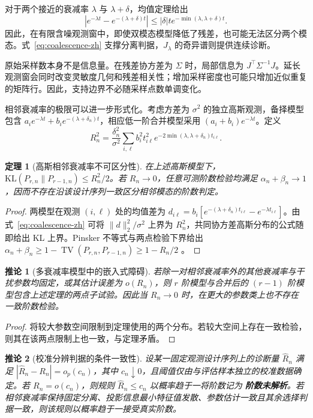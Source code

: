 \documentclass[UTF8,11pt]{ctexart}
\newtheorem{theorem}{定理}
\newtheorem{corollary}{推论}
\newcommand{\indet}{\textup{\bfseries 阶数未解析}}
\begin{document}
对于两个接近的衰减率 $\lambda$ 与 $\lambda+\delta$，均值定理给出
\begin{equation}
|e^{-\lambda t}-e^{-(\lambda+\delta)t}|
\le |\delta|t e^{-\min(\lambda,\lambda+\delta)t}.
\label{eq:coalescence-zh}
\end{equation}
因此，在有限含噪观测窗中，即使双模态模型降低了残差，也可能无法区分两个模态。式~\eqref{eq:coalescence-zh} 支撑分离判据，$J_\lambda$ 的奇异谱则提供连续诊断。

原始采样数本身不是信息量。在残差协方差为 $\Sigma$ 时，局部信息为 $J^\top\Sigma^{-1}J$。延长观测窗会同时改变灵敏度几何和残差相关性；增加采样密度也可能只增加近似重复的矩阵行。因此，支持边界不必随采样点数单调变化。

相邻衰减率的极限可以进一步形式化。考虑方差为 $\sigma^2$ 的独立高斯观测，备择模型包含 $a_i e^{-\lambda t}+b_i e^{-(\lambda+\delta_n)t}$，相应低一阶合并模型采用 $(a_i+b_i)e^{-\lambda t}$。定义
\begin{equation}
R_n^2=\frac{\delta_n^2}{\sigma^2}\sum_{i,\ell}b_i^2t_{i\ell}^2
e^{-2\min(\lambda,\lambda+\delta_n)t_{i\ell}}.
\label{eq:boundary-index-zh}
\end{equation}

\begin{theorem}[高斯相邻衰减率不可区分性]
在上述高斯模型下，$\mathrm{KL}(P_{r,n}\|P_{r-1,n})\le R_n^2/2$。若 $R_n\to0$，任意可测阶数检验均满足 $\alpha_n+\beta_n\to1$，因而不存在沿该设计序列一致区分相邻模态的阶数判定。
\end{theorem}
\begin{proof}
两模型在观测 $(i,\ell)$ 处的均值差为 $d_{i\ell}=b_i[e^{-(\lambda+\delta_n)t_{i\ell}}-e^{-\lambda t_{i\ell}}]$。由式~\eqref{eq:coalescence-zh} 可将 $\|d\|_2^2/\sigma^2$ 上界为 $R_n^2$，共同协方差高斯分布的公式随即给出 KL 上界。Pinsker 不等式与两点检验下界给出 $\alpha_n+\beta_n\ge1-\operatorname{TV}(P_{r,n},P_{r-1,n})\ge1-R_n/2$ \cite{tsybakov2009nonparametric}。
\end{proof}

\begin{corollary}[多衰减率模型中的嵌入式障碍]
若除一对相邻衰减率外的其他衰减率与干扰参数均固定，或其估计误差为 $o(R_n)$，则 $r$ 阶模型与合并后的 $(r-1)$ 阶模型包含上述定理的两点子试验。因此当 $R_n\to0$ 时，在更大的参数类上也不存在一致阶数检验。
\end{corollary}
\begin{proof}
将较大参数空间限制到定理使用的两个分布。若较大空间上存在一致检验，则其在该两点限制上也一致，与定理矛盾。
\end{proof}
\begin{corollary}[校准分辨判据的条件一致性]
设某一固定观测设计序列上的诊断量 $\widehat R_n$ 满足 $|\widehat R_n-R_n|=o_p(c_n)$，其中 $c_n\downarrow0$，且阈值仅由与评估样本独立的校准数据确定。若 $R_n=o(c_n)$，则规则 $\widehat R_n\le c_n$ 以概率趋于一将阶数记为 \indet{}。若相邻衰减率保持固定分离、投影信息最小特征值发散、参数估计一致且其余选择判据一致，则该规则以概率趋于一接受真实阶数。
\end{corollary}
\end{document}
